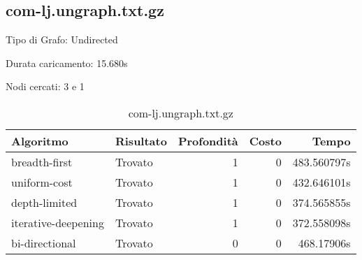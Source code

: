 \subsection{com-lj.ungraph.txt.gz}
Tipo di Grafo: Undirected

Durata caricamento: 15.680s

Nodi cercati: 3 e 1

\begin{table}[h]
	\centering
	\begin{tabular}{|l|l|r|r|r|}
		\hline
		\textbf{Algoritmo}  & \textbf{Risultato} & \textbf{Profondità} & \textbf{Costo} & \textbf{Tempo} \\
		\hline
		breadth-first       & Trovato            & 1                   & 0              & 483.560797s    \\
		uniform-cost        & Trovato            & 1                   & 0              & 432.646101s    \\
		depth-limited       & Trovato            & 1                   & 0              & 374.565855s    \\
		iterative-deepening & Trovato            & 1                   & 0              & 372.558098s    \\
		bi-directional      & Trovato            & 0                   & 0              & 468.17906s     \\
		\hline
	\end{tabular}
	\caption{com-lj.ungraph.txt.gz}
\end{table}
